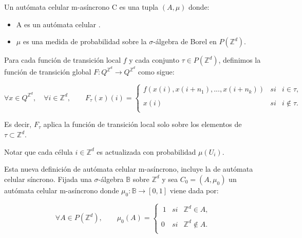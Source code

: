 \documentclass[../proyecto.tex]{memoir}
\begin{document}
\begin{defi}
Un autómata celular m-asíncrono C es una tupla $(A, \mu)$ donde: 
\begin{itemize}
\item A es un autómata celular .
\item $\mu$ es una medida de probabilidad sobre la $\sigma$-álgebra de Borel en $P(\mathds{Z}^{d})$.
\end{itemize} 
\end{defi}
\begin{defi}

Para cada función de transición local $f$ y cada conjunto $\tau \in P(\mathds{Z}^{d})$, definimos la función de transición global $F:Q^{\mathds{Z}^{d}} \rightarrow Q^{\mathds{Z}^{d}}$ como sigue:

\begin{equation*}
	\forall x \in Q^{\mathds{Z}^{d}}, \quad \forall i \in \mathds{Z}^{d}, \qquad
	F_{\tau}(x)(i) = \left\{ \begin{array}{lcc}
             f(x(i),x(i+n_{1}),...,x(i+n_{k})) &   si  & i \in \tau ,\\
             \\ x(i) & si  & i \notin \tau .\\
             \end{array}
             \right.
\end{equation*}

Es decir, $F_{\tau}$ aplica la función de transición local solo sobre los elementos de $\tau \subset \mathds{Z}^{d}$. 
\end{defi}

Notar que cada célula $i \in \mathds{Z}^{d}$ es actualizada con probabilidad $\mu(U_{i})$.

Esta nueva definición de autómata celular m-asíncrono, incluye la de autómata celular síncrono. Fijada una $\sigma$-álgebra $\mathds{B}$ sobre $\mathds{Z}^{d}$ y sea $C_{0}=(A, \mu_{0})$ un autómata celular m-asíncrono donde $\mu_{0}: \mathds{B} \rightarrow [0,1]$ viene dada por: 

\begin{equation*}
	 \forall A \in P(\mathds{Z}^{d}), \qquad 
	 \mu_{0}(A) = \left\{ \begin{array}{lcc}
             \ 1 &   si  & \mathds{Z}^{d} \in A ,\\
             \\0 &   si  & \mathds{Z}^{d} \notin A .\\
             \end{array}
             \right.
\end{equation*}
\end{document}
